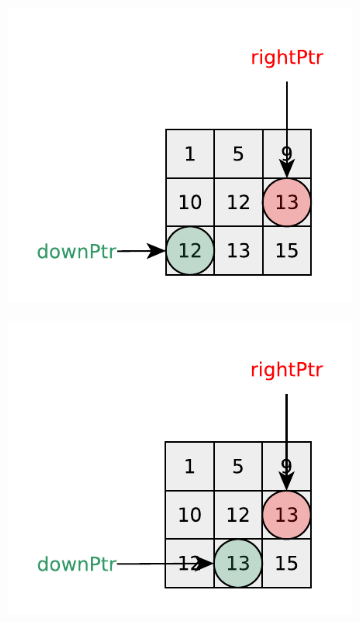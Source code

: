 \begin{figure}
\begin{subfigure}[t]{0.32\textwidth}
		\caption{}
		\label{fig:kth_smallest_in_sorted_matrix:visit4}
	\end{subfigure}
	\hfill
	\begin{subfigure}[t]{0.32\textwidth}
		\includegraphics[width=1\linewidth]{sources/kth_smallest_in_sorted_matrix/images/visit5}
		\caption{}
		\label{fig:kth_smallest_in_sorted_matrix:visit5}
	\end{subfigure}
	\hfill
	\begin{subfigure}[t]{0.32\textwidth}
		\includegraphics[width=1\linewidth]{sources/kth_smallest_in_sorted_matrix/images/visit6}

\end{subfigure}
\end{figure}
